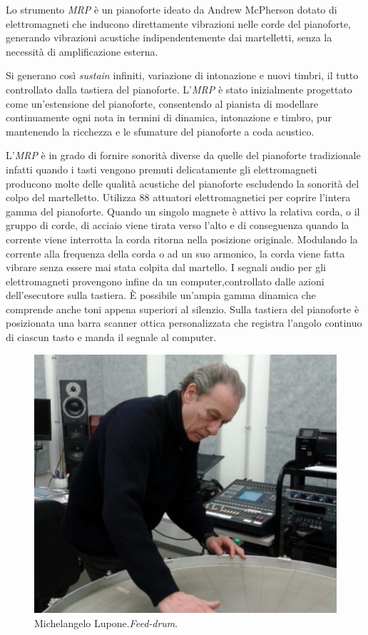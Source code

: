 Lo strumento \emph{MRP} è un pianoforte ideato da Andrew McPherson \cite{amp:mrp}
dotato di elettromagneti  che inducono direttamente vibrazioni nelle corde del
pianoforte, generando vibrazioni acustiche indipendentemente dai martelletti,
senza la necessità di amplificazione esterna.

Si generano così \emph{sustain} infiniti, variazione di intonazione e nuovi
timbri, il tutto controllato dalla tastiera del pianoforte. L'\emph{MRP} è
stato inizialmente progettato come un'estensione del pianoforte, consentendo
al pianista di modellare continuamente ogni nota in termini di dinamica,
intonazione e timbro, pur mantenendo la ricchezza e le sfumature del pianoforte
a coda acustico.

L'\emph{MRP} è in grado di fornire sonorità diverse da quelle del pianoforte
tradizionale infatti quando i tasti vengono premuti delicatamente gli
elettromagneti producono molte delle qualità acustiche del pianoforte
escludendo la sonorità del colpo del martelletto. Utilizza 88 attuatori elettromagnetici per coprire l'intera gamma del pianoforte. Quando un singolo
magnete è attivo la relativa corda, o il gruppo di corde, di acciaio viene
tirata verso l’alto e di conseguenza quando la corrente viene interrotta la
corda ritorna nella posizione originale. Modulando la corrente alla frequenza
della corda o ad un suo armonico, la corda viene fatta vibrare senza essere mai
stata colpita dal martello. I segnali audio per gli elettromagneti provengono
infine da un computer,controllato dalle azioni dell’esecutore sulla tastiera.
È possibile un'ampia gamma dinamica che comprende anche toni appena superiori
al silenzio. Sulla tastiera del pianoforte è posizionata una barra scanner
ottica personalizzata che registra l'angolo continuo di ciascun tasto e manda
il segnale al computer.

\begin{figure}%
\centering
\includegraphics[width=0.99\columnwidth]{Graphics/foto/michelangelo_lupone_recadre}
\caption[]{Michelangelo Lupone.\emph{Feed-drum}.}
\label{mrp}
\end{figure}

